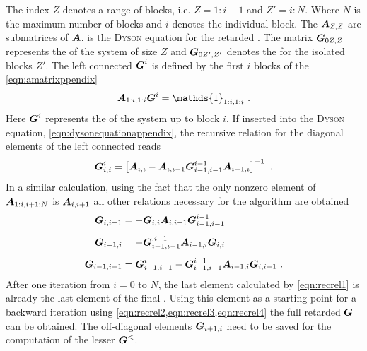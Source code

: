 The index $Z$ denotes a range of blocks, i.e. $Z = 1:i-1$ and $Z'=i:N$. Where $N$ is the maximum number of blocks and $i$ denotes the individual block. The $\boldsymbol{A}_{Z,Z}$ are submatrices of $\boldsymbol{A}$.  is the \textsc{Dyson} equation for the retarded \gfnc{}. The matrix $\boldsymbol{G}_{0 Z,Z}$ represents the \gfnc{} of the system of size $Z$ and $\boldsymbol{G}_{0 Z',Z'}$ denotes the \gfnc{} for the isolated blocks $Z'$.
The left connected \gfnc{} $\boldsymbol{G}^i$ is defined by the first $i$ blocks of the \cref{eqn:amatrixppendix} 
\begin{align}
\mat{A}_{1:i,1:i}\mat{G}^{i}=\mathds{1}_{1:i,1:i}\ .
\end{align}
Here $\boldsymbol{G}^i$ represents the \gfnc{} of the system up to block $i$.
If inserted into the \textsc{Dyson} equation, \cref{eqn:dysonequationappendix}, the recursive relation for the diagonal elements of the left connected \gfnc{} reads
\begin{align}
  \mat{G}^{i}_{i,i} = \left[\mat{A}_{i,i}-\mat{A}_{i,i-1}\mat{G}^{i-1}_{i-1,i-1}\mat{A}_{i-1,i}\right]^{-1}\ .
  \label{eqn:recrel1}
\end{align}
In a similar calculation, using the fact that the only nonzero element of $\boldsymbol{A}_{1:i,i+1:N}$ is $\boldsymbol{A}_{i,i+1}$ all other relations necessary for the algorithm are obtained
\begin{align}
  \mat{G}_{i,i-1} &= -\mat{G}_{i,i}\mat{A}_{i,i-1}\mat{G}^{i-1}_{i-1,i-1}\label{eqn:recrel2}\\\addlinespace
  \mat{G}_{i-1,i} &= -\mat{G}^{,i-1}_{i-1,i-1}\mat{A}_{i-1,i} \mat{G}_{i,i}\label{eqn:recrel3}\\\addlinespace
  \mat{G}_{i-1,i-1} &= \mat{G}^{i}_{i-1,i-1}-\mat{G}^{i-1}_{i-1,i-1}\mat{A}_{i-1,i}\mat{G}_{i,i-1}\label{eqn:recrel4}\ .
\end{align}
After one iteration from $i=0$ to $N$, the last element calculated by \cref{eqn:recrel1} is already the last element of the final \gfnc{}. Using this element as a starting point for a backward iteration using \cref{eqn:recrel2,eqn:recrel3,eqn:recrel4} the full retarded \gnfc{} $\boldsymbol{G}$ can be obtained. The off-diagonal elements $\boldsymbol{G}_{i+1,i}$ need to be saved for the computation of the lesser \gfnc{} $\boldsymbol{G}^<$.
